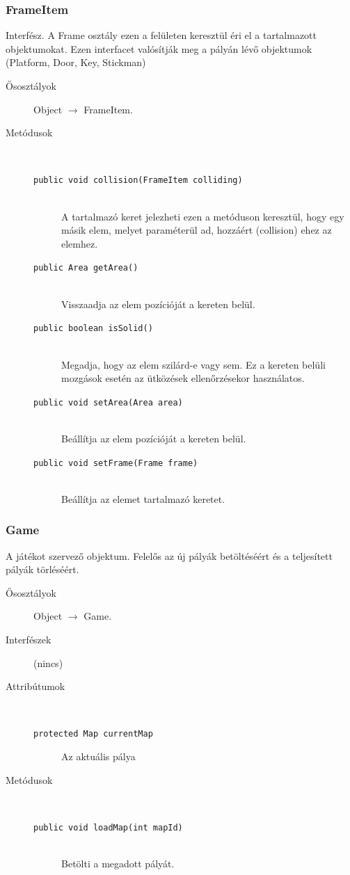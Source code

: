 		\subsubsection{FrameItem} Interfész.
				 A Frame osztály ezen a felületen keresztül éri el a tartalmazott objektumokat.   Ezen interfacet valósítják meg a pályán lévő objektumok (Platform, Door, Key, Stickman) 			\begin{description}


				\item[Ősosztályok] Object $\rightarrow{}$ FrameItem.
				\item[Metódusok]$\ $
					\begin{description}
						\item[\texttt{public void collision(FrameItem colliding)}] \hfill \\ A tartalmazó keret jelezheti ezen a metóduson keresztül,  hogy egy másik elem, melyet paraméterül ad,  hozzáért (collision) ehez az elemhez. 
						\item[\texttt{public Area getArea()}] \hfill \\ Visszaadja az elem pozícióját a kereten belül. 
						\item[\texttt{public boolean isSolid()}] \hfill \\ Megadja, hogy az elem szilárd-e vagy sem.  Ez a kereten belüli mozgások esetén az  ütközések ellenőrzésekor használatos. 
						\item[\texttt{public void setArea(Area area)}] \hfill \\ Beállítja az elem pozícióját a kereten belül. 
						\item[\texttt{public void setFrame(Frame frame)}] \hfill \\ Beállítja az elemet tartalmazó keretet. 
					\end{description}
			\end{description}

		\subsubsection{Game}
				 A játékot szervező objektum. Felelős az új pályák betöltéséért és a teljesített pályák törléséért. 			\begin{description}


				\item[Ősosztályok] Object $\rightarrow{}$ Game.
				\item[Interfészek] (nincs)
				\item[Attribútumok]$\ $
					\begin{description}
						\item[\texttt{protected Map currentMap}] Az aktuális pálya 
					\end{description}
				\item[Metódusok]$\ $
					\begin{description}
						\item[\texttt{public void loadMap(int mapId)}] \hfill \\ Betölti a megadott pályát. 
					\end{description}
			\end{description}

